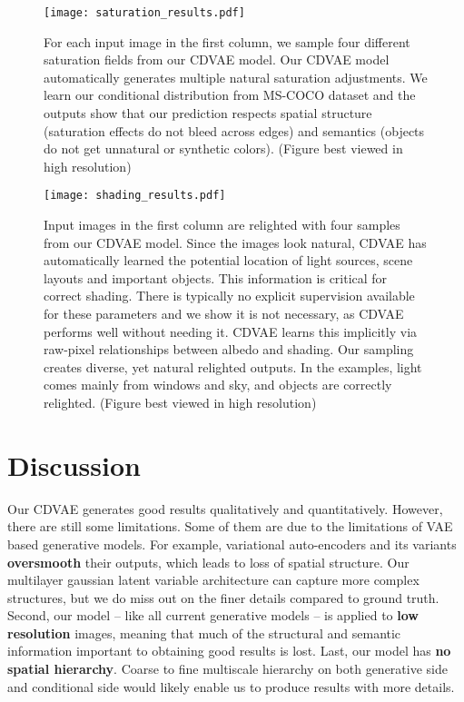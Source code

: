 \documentclass[10pt,twocolumn,letterpaper]{article}
\begin{document}
\begin{figure}[!t]
\centerline{  \texttt{[image: saturation\_results.pdf]}}
  \caption{For each input image in the first column, we sample four different saturation fields from our CDVAE model. 
  Our CDVAE model automatically generates multiple natural saturation adjustments. We learn our conditional distribution from 
   MS-COCO dataset and the outputs show that our prediction respects spatial structure (saturation effects do not bleed 
   across edges) and semantics (objects do not get unnatural or synthetic colors). (Figure best viewed in high resolution)}
  \label{fig:saturation}
\end{figure}


\begin{figure}[!t]
\centerline{\texttt{[image: shading\_results.pdf]}}
  \caption{Input images in the first column are relighted with four samples from our CDVAE model. Since the
   images look natural, CDVAE has automatically learned the potential location of light sources, scene 
   layouts and important objects. This information is critical for correct shading. There is typically no explicit 
   supervision available for these parameters and we show it is not necessary, as CDVAE performs well 
   without needing it. CDVAE learns this implicitly via raw-pixel relationships between albedo and 
   shading. Our sampling creates diverse, yet natural relighted outputs. In the examples, light comes mainly 
   from windows and sky,  and objects are correctly relighted. (Figure best viewed in high resolution)}
  \label{fig:shading}
\end{figure}


\section{Discussion}

Our CDVAE generates good results qualitatively and quantitatively. However, there are still some 
limitations. Some of them are due to the limitations of VAE based generative models. For example, 
variational auto-encoders and its variants {\bf oversmooth} their outputs, which leads to loss
of spatial structure. Our multilayer gaussian latent variable architecture can capture more 
complex structures, but we do miss out on the finer details compared to ground truth.  
Second, our model -- like all current generative models -- is applied to {\bf low resolution} 
images, meaning that much of the structural and semantic information important to obtaining good 
results is lost. Last, our model has {\bf no spatial hierarchy}. Coarse to fine multiscale 
hierarchy on both generative side and conditional side would likely enable us to produce
results with more details. 
\end{document}
